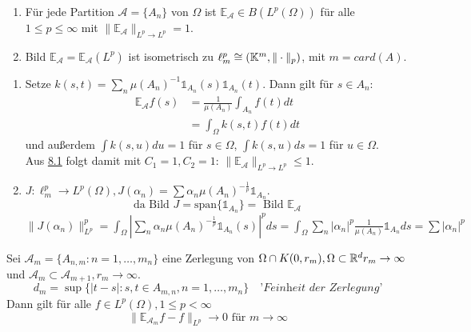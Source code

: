 \begin{kor}
	\begin{enumerate}[label=\alph*\upshape)]
		\item Für jede Partition $\mathcal{A} = \{ A_{n} \}$ von $\Omega$ ist $\mathds{E}_{\mathcal{A}} \in B \left( L^{p}(\Omega) \right)$ für alle $1 \leq p \leq \infty$ mit $\| \mathds{E}_{\mathcal{A}} \|_{L^{p} \rightarrow L^{p}} = 1.$
		\item Bild $\mathds{E}_{\mathcal{A}} = \mathds{E}_{\mathcal{A}}(L^{p})$ ist isometrisch zu $\ell^{p}_{m} \cong \left( \mathbb{K}^{m}, \| \cdot \|_{p} \right)$, mit $m = card(A)$.  
	\end{enumerate}
	\begin{beweis}	
		\begin{enumerate}[label=\alph*\upshape)]	
			\item Setze $k(s, t) = \sum_{n} \mu(A_{n})^{-1} \mathds{1}_{A_{n}}(s) \mathds{1}_{A_{n}}(t)$. Dann gilt für $s \in A_{n}$:
				\begin{align*}
					 \mathds{E}_{\mathcal{A}} f(s) & = \frac{1}{\mu(A_{n})} \int_{A_{n}} f(t) dt \\
					 & = \int_{\Omega} k(s, t) f(t) dt
				\end{align*}
				und au{\ss}erdem $\int k(s, u) du = 1$ für $s \in \Omega$, $\int k(s, u) ds = 1$ für $u \in \Omega$. \\
				Aus \hyperref[satz:8.1]{8.1} folgt damit mit $C_{1} = 1, C_{2} = 1$: $\| \mathds{E}_{\mathcal{A}} \|_{L^{p} \rightarrow L^{p}} \leq 1$.
			\item $J: \ell_{m}^{p} \rightarrow L^{p}(\Omega), J(\alpha_{n}) = \sum \alpha_{n} \mu(A_{n})^{- \frac{1}{p}} \mathds{1}_{A_{n}}.$ \\
				\[ \text{da Bild } J = \text{span} \{ \mathds{1}_{A_{n}} \} = \text{ Bild } \mathds{E}_{\mathcal{A}} \]
				$\| J ( \alpha_{n}) \|_{L^{p}}^{p} = \int_{\Omega} | \sum_{n} \alpha_{n} \mu(A_{n})^{- \frac{1}{p}} \mathds{1}_{A_{n}}(s) |^{p} ds = \int_{\Omega} \sum_{n} | \alpha_{n} |^{p} \frac{1}{\mu(A_{n})} \mathds{1}_{A_{n}} ds = \sum |\alpha_{n}|^{p}$
		\end{enumerate}
	\end{beweis}
\end{kor}

\begin{satz} 
	Sei $\mathcal{A}_{m} = \{ A_{n, m} : n = 1, \dotsc, m_{n} \}$ eine Zerlegung von $ \Omega \cap K(0, r_{m}), \Omega \subset \mathbb{R}^{d} r_{m} \rightarrow \infty$ und $\mathcal{A}_{m} \subset \mathcal{A}_{m + 1}, r_{m} \rightarrow \infty$.
	\[ d_{m} = \sup \{ |t - s|: s, t \in A_{m, n}, n = 1, \dotsc, m_{n} \} \quad \textit{'Feinheit der Zerlegung'} \]
	Dann gilt für alle $f \in L^{p}(\Omega), 1 \leq p < \infty$
	\[ \| \mathds{E}_{\mathcal{A}_{m}} f - f \|_{L^{p}} \rightarrow 0 \text{ für } m \rightarrow \infty \]
\end{satz}

